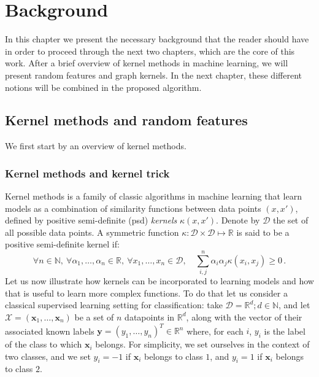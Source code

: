 \newcommand{\todoNK}[1]{\textbf{\textcolor{red}{NK: #1}}}
\chapter{Background}
\label{chapter:background}
\newtheorem{theorem}{Theorem}
In this chapter we present the necessary background that the reader should have in order to proceed through the next two chapters, which are the core of this work. After a brief overview of kernel methods in machine learning, we will present random features and graph kernels. In the next chapter, these different notions will be combined in the proposed algorithm.

\section{Kernel methods and random features}

We first start by an overview of kernel methods.

\subsection{Kernel methods and kernel trick}
Kernel methods is a family of classic algorithms in machine learning that learn models as a combination of similarity functions between data points $(x,x')$, defined by positive semi-definite (psd) \emph{kernels} $\kappa(x,x')$. Denote by $\mathcal{D}$ the set of all possible data points. A symmetric function $\kappa:\mathcal{D}\times\mathcal{D}\mapsto\mathbb{R}$ is said to be a positive semi-definite kernel if:
\begin{equation}
\forall n\in \mathbb{N},~\forall \alpha_1,\ldots,\alpha_n\in \mathbb{R},~\forall x_1,\ldots,x_n\in \mathcal{D},\quad \sum_{i,j}^n\alpha_i\alpha_j\kappa(x_i,x_j)\geq 0 \, .
\end{equation}
Let us now illustrate how kernels can be incorporated to learning models and how that is useful to learn more complex functions. To do that let us consider a classical supervised learning setting for classification: take $\mathcal{D}=\mathbb{R}^d; d\in\mathbb{N}$, and let $\mathcal{X}=(\mathbf{x}_1,\ldots,\mathbf{x}_n)$ be a set of $n$ datapoints in $\mathbb{R}^d$, along with the vector of their associated known labels $\mathbf{y}=(y_1,\ldots,y_n)^T\in\mathbb{R}^n$ where, for each $i$, $y_i$ is the label of the class to which $\mathbf{x}_i$ belongs. For simplicity, we set ourselves in the context of two classes, and we set $y_i=-1$ if $\mathbf{x}_i$ belongs to class $1$, and $y_i=1$ if $\mathbf{x}_i$ belongs to class $2$. 

